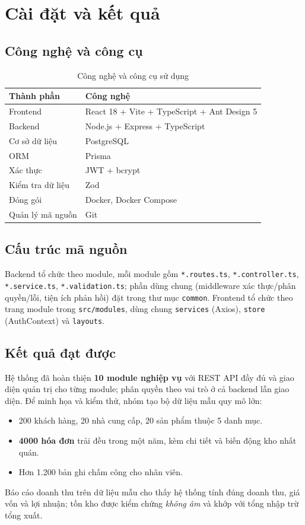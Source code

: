 \documentclass[12pt,a4paper]{report}
\begin{document}
\chapter{Cài đặt và kết quả}

\section{Công nghệ và công cụ}
\begin{table}[H]\centering\small
\begin{tabularx}{\textwidth}{|L{3.2cm}|X|}
\hline
\textbf{Thành phần} & \textbf{Công nghệ} \\ \hline
Frontend & React 18 + Vite + TypeScript + Ant Design 5 \\ \hline
Backend & Node.js + Express + TypeScript \\ \hline
Cơ sở dữ liệu & PostgreSQL \\ \hline
ORM & Prisma \\ \hline
Xác thực & JWT + bcrypt \\ \hline
Kiểm tra dữ liệu & Zod \\ \hline
Đóng gói & Docker, Docker Compose \\ \hline
Quản lý mã nguồn & Git \\ \hline
\end{tabularx}
\caption{Công nghệ và công cụ sử dụng}
\end{table}

\section{Cấu trúc mã nguồn}
Backend tổ chức theo module, mỗi module gồm \texttt{*.routes.ts}, \texttt{*.controller.ts}, \texttt{*.service.ts}, \texttt{*.validation.ts}; phần dùng chung (middleware xác thực/phân quyền/lỗi, tiện ích phản hồi) đặt trong thư mục \texttt{common}. Frontend tổ chức theo trang module trong \texttt{src/modules}, dùng chung \texttt{services} (Axios), \texttt{store} (AuthContext) và \texttt{layouts}.

\section{Kết quả đạt được}
Hệ thống đã hoàn thiện \textbf{10 module nghiệp vụ} với REST API đầy đủ và giao diện quản trị cho từng module; phân quyền theo vai trò ở cả backend lẫn giao diện. Để minh họa và kiểm thử, nhóm tạo bộ dữ liệu mẫu quy mô lớn:
\begin{itemize}[leftmargin=1.4cm,nosep]
  \item 200 khách hàng, 20 nhà cung cấp, 20 sản phẩm thuộc 5 danh mục.
  \item \textbf{4000 hóa đơn} trải đều trong một năm, kèm chi tiết và biến động kho nhất quán.
  \item Hơn 1.200 bản ghi chấm công cho nhân viên.
\end{itemize}
Báo cáo doanh thu trên dữ liệu mẫu cho thấy hệ thống tính đúng doanh thu, giá vốn và lợi nhuận; tồn kho được kiểm chứng \emph{không âm} và khớp với tổng nhập trừ tổng xuất.
\end{document}
